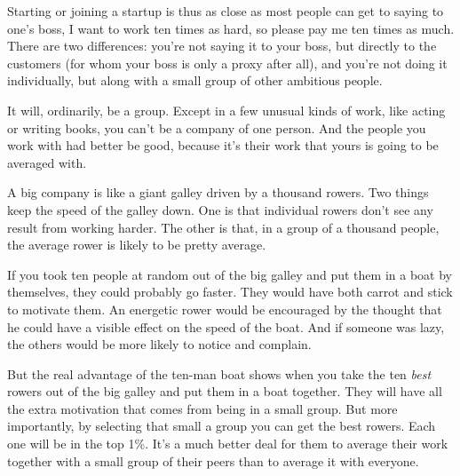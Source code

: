 Starting
                    or joining a startup is thus as close as most people can get
                    to saying to one's boss, I want to work ten times as hard,
                    so please pay me ten times as much. There are two
                    differences: you're not saying it to your boss, but directly
                    to the customers (for whom your boss is only a proxy after
                    all), and you're not doing it individually, but along with a
                    small group of other ambitious people.

It will,
                    ordinarily, be a group. Except in a few unusual kinds of
                    work, like acting or writing books, you can't be a company
                    of one person. And the people you work with had better be
                    good, because it's their work that yours is going to be
                    averaged with.

A big company is like a giant
                    galley driven by a thousand rowers. Two things keep the
                    speed of the galley down. One is that individual rowers
                    don't see any result from working harder. The other is that,
                    in a group of a thousand people, the average rower is likely
                    to be pretty average.

If you took ten people at
                    random out of the big galley and put them in a boat by
                    themselves, they could probably go faster. They would have
                    both carrot and stick to motivate them. An energetic rower
                    would be encouraged by the thought that he could have a
                    visible effect on the speed of the boat. And if someone was
                    lazy, the others would be more likely to notice and
                    complain.

But the real advantage of the ten-man
                    boat shows when you take the ten \emph{best} rowers out of
                    the big galley and put them in a boat together. They will
                    have all the extra motivation that comes from being in a
                    small group. But more importantly, by selecting that small a
                    group you can get the best rowers. Each one will be in the
                    top 1\%. It's a much better deal for them to average their
                    work together with a small group of their peers than to
                    average it with everyone.


